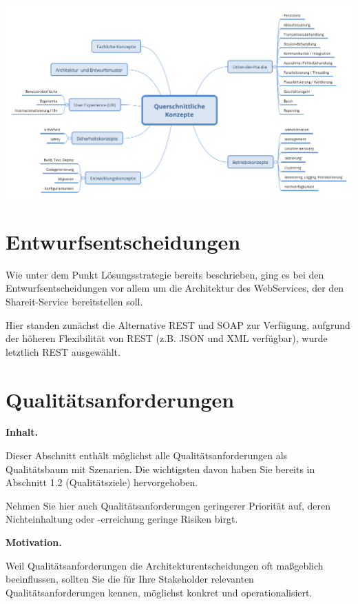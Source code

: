 \documentclass[]{article}
\begin{document}
\includegraphics{images/08-Crosscutting-Concepts-Structure-DE.png}


\section{Entwurfsentscheidungen}\label{section-design-decisions}

Wie unter dem Punkt Lösungsstrategie bereits beschrieben, ging es bei den Entwurfsentscheidungen vor allem um die Architektur des WebServices, der den Shareit-Service bereitstellen soll.

Hier standen zunächst die Alternative REST und SOAP zur Verfügung, aufgrund der höheren Flexibilität von REST (z.B. JSON und XML verfügbar), wurde letztlich REST ausgewählt.




\section{Qualitätsanforderungen}\label{section-quality-scenarios}

\textbf{Inhalt.}

Dieser Abschnitt enthält möglichst alle Qualitätsanforderungen als
Qualitätsbaum mit Szenarien. Die wichtigsten davon haben Sie bereits in
Abschnitt 1.2 (Qualitätsziele) hervorgehoben.

Nehmen Sie hier auch Qualitätsanforderungen geringerer Priorität auf,
deren Nichteinhaltung oder -erreichung geringe Risiken birgt.

\textbf{Motivation.}

Weil Qualitätsanforderungen die Architekturentscheidungen oft maßgeblich
beeinflussen, sollten Sie die für Ihre Stakeholder relevanten
Qualitätsanforderungen kennen, möglichst konkret und operationalisiert.
\end{document}
